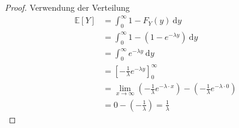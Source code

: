 \documentclass[a4paper]{scrartcl}
\newcommand{\dif}{\ \mathrm{d}}
\newcommand{\e}{\mathbb{E}}
\def \blattnr {4}
\begin{document}
\begin{enumerate}[label=\bfseries \blattnr.\arabic*]
\begin{enumerate}
\begin{proof}
                    Verwendung der Verteilung
                    \begin{equation*}
                        \begin{split}
                            \e[Y]
                            &= \int_0^\infty 1 - F_Y(y) \dif y \\
                            &= \int_0^\infty 1 - (1 - e^{-\lambda y}) \dif y \\
                            &= \int_0^\infty e^{-\lambda y} \dif y \\
                            &= \left[ -\frac{1}{\lambda}e^{-\lambda y}
                                 \right]_0^\infty \\
                            &= \lim_{x \to \infty} \left(
                                 -\frac{1}{\lambda}e^{-\lambda \cdot x} \right) 
                                 -\left( -\frac{1}{\lambda}e^{-\lambda \cdot 0}
                                 \right) \\
                            &= 0 - \left( -\frac{1}{\lambda} \right)
                             = \frac{1}{\lambda}
                        \end{split}
                    \end{equation*}
                \end{proof}


\end{enumerate}
\end{enumerate}
\end{document}
